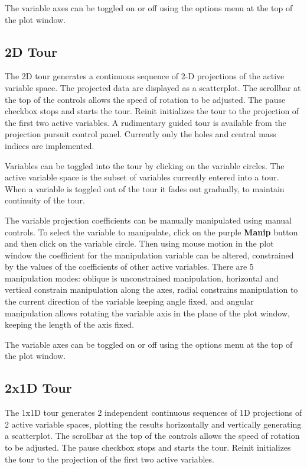 \documentclass[11pt]{article}
\begin{document}
The variable axes can be toggled on or off using the options menu at
the top of the plot window.

\subsection{2D Tour}
\label{slbl:2DTour}

The 2D tour generates a continuous sequence of 2-D projections of the
active variable space. The projected data are displayed as a
scatterplot. The scrollbar at the top of the controls allows the speed
of rotation to be adjusted. The pause checkbox stops and starts the
tour. Reinit initializes the tour to the projection of the first two
active variables. A rudimentary guided tour is available from the
projection pursuit control panel. Currently only the holes and central
mass indices are implemented.

Variables can be toggled into the tour by clicking on the variable
circles. The active variable space is the subset of variables
currently entered into a tour. When a variable is toggled out of the
tour it fades out gradually, to maintain continuity of the tour.

The variable projection coefficients can be manually manipulated using
manual controls. To select the variable to manipulate, click on the
purple {\bf Manip} button and then click on the variable circle. Then
using mouse motion in the plot window the coefficient for the
manipulation variable can be altered, constrained by the values of the
coefficients of other active variables. There are 5 manipulation
modes: oblique is unconstrained manipulation, horizontal and vertical
constrain manipulation along the axes, radial constrains manipulation
to the current direction of the variable keeping angle fixed, and
angular manipulation allows rotating the variable axis in the plane of
the plot window, keeping the length of the axis fixed.

The variable axes can be toggled on or off using the options menu at
the top of the plot window.

\subsection{2x1D Tour}
\label{slbl:2x1DTour}

The 1x1D tour generates 2 independent continuous sequences of 1D
projections of 2 active variable spaces, plotting the results
horizontally and vertically generating a scatterplot. The scrollbar at
the top of the controls allows the speed of rotation to be
adjusted. The pause checkbox stops and starts the tour. Reinit
initializes the tour to the projection of the first two active
variables.
\end{document}
